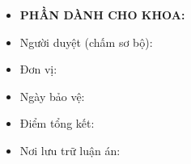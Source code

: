 \vspace{2cm}

\noindent
{\small
\begin{itemize}[leftmargin=0pt, itemsep=-4pt, topsep=0pt, parsep=0pt]
    \item[] \textbf{PHẦN DÀNH CHO KHOA:}
    \item[] Người duyệt (chấm sơ bộ):
    \item[] Đơn vị:
    \item[] Ngày bảo vệ:
    \item[] Điểm tổng kết:
    \item[] Nơi lưu trữ luận án:
\end{itemize}
}

\clearpage